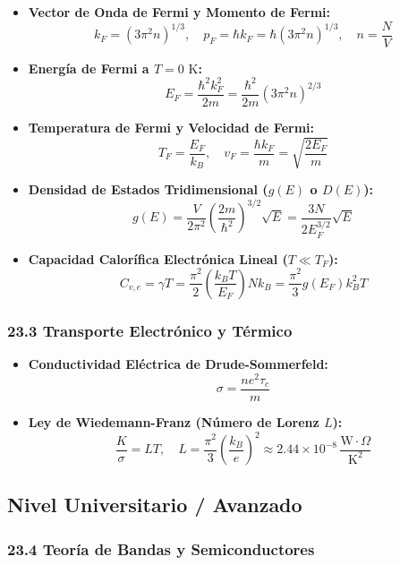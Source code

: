 \documentclass[11pt,a4paper]{article}
\begin{document}
\begin{itemize}
  \item \textbf{Vector de Onda de Fermi y Momento de Fermi:}
  \[
    k_F = (3\pi^2 n)^{1/3}, \quad p_F = \hbar k_F = \hbar (3\pi^2 n)^{1/3}, \quad n = \frac{N}{V}
  \]
  \item \textbf{Energía de Fermi a $T = 0\text{ K}$:}
  \[
    E_F = \frac{\hbar^2 k_F^2}{2m} = \frac{\hbar^2}{2m}(3\pi^2 n)^{2/3}
  \]
  \item \textbf{Temperatura de Fermi y Velocidad de Fermi:}
  \[
    T_F = \frac{E_F}{k_B}, \quad v_F = \frac{\hbar k_F}{m} = \sqrt{\frac{2E_F}{m}}
  \]
  \item \textbf{Densidad de Estados Tridimensional ($g(E)$ o $D(E)$):}
  \[
    g(E) = \frac{V}{2\pi^2}\left( \frac{2m}{\hbar^2} \right)^{3/2} \sqrt{E} = \frac{3N}{2E_F^{3/2}}\sqrt{E}
  \]
  \item \textbf{Capacidad Calorífica Electrónica Lineal ($T \ll T_F$):}
  \[
    C_{v,e} = \gamma T = \frac{\pi^2}{2}\left( \frac{k_B T}{E_F} \right) N k_B = \frac{\pi^2}{3} g(E_F) k_B^2 T
  \]
\end{itemize}

\subsubsection*{23.3 Transporte Electrónico y Térmico}

\begin{itemize}
  \item \textbf{Conductividad Eléctrica de Drude-Sommerfeld:}
  \[
    \sigma = \frac{n e^2 \tau_c}{m}
  \]
  \item \textbf{Ley de Wiedemann-Franz (Número de Lorenz $L$):}
  \[
    \frac{K}{\sigma} = L T, \quad L = \frac{\pi^2}{3}\left( \frac{k_B}{e} \right)^2 \approx 2.44 \times 10^{-8} \, \frac{\text{W}\cdot\Omega}{\text{K}^2}
  \]
\end{itemize}

\subsection*{Nivel Universitario / Avanzado}

\subsubsection*{23.4 Teoría de Bandas y Semiconductores}
\end{document}
